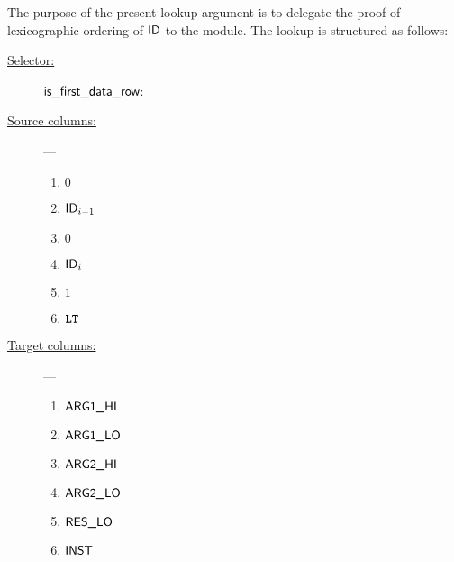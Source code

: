 The purpose of the present lookup argument is to delegate the proof of lexicographic ordering of $\textsf{ID}$ to the \wcpMod{} module.
The lookup is structured as follows:
\begin{description}
	\item[\underline{Selector:}] $\textsf{is\_first\_data\_row}$:
	\item[\underline{Source columns:}] ---
		\begin{multicols}{3}
			\begin{enumerate}
				\item $0$
				\item $\textsf{ID}_{i - 1}$
				\item $0$
				\item $\textsf{ID}_{i}$
				\item $1$
				\item $\texttt{LT}$
			\end{enumerate}
		\end{multicols}
	\item[\underline{Target columns:}] ---
		\begin{multicols}{3}
		\begin{enumerate}
			\item $\textsf{ARG}\textsf{1}\textsf{\_HI}$
			\item $\textsf{ARG}\textsf{1}\textsf{\_LO}$
			\item $\textsf{ARG}\textsf{2}\textsf{\_HI}$
			\item $\textsf{ARG}\textsf{2}\textsf{\_LO}$
			\item $\textsf{RES}\textsf{\_LO}$
			\item $\textsf{INST}$
		\end{enumerate}
		\end{multicols}
\end{description}

